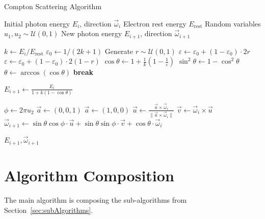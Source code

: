 \begin{algorithm}[H]
\caption{Compton Scattering Algorithm}
\label{alg:comptonScatteringBlank}
\begin{algorithmic}[1]
\Require Initial photon energy $E_i$, direction $\vec{\omega}_i$
\Require Electron rest energy $E_\text{rest}$
\Require Random variables $u_1, u_2 \sim \mathcal{U}(0, 1)$
\Ensure New photon energy $E_{i+1}$, direction $\vec{\omega}_{i+1}$

\State $k \gets E_i / E_\text{rest}$
\State $\varepsilon_0 \gets 1 / (2k + 1)$
\Repeat
    \State Generate $r \sim \mathcal{U}(0, 1)$
        \State $\varepsilon \gets \varepsilon_0 + (1 - \varepsilon_0) \cdot 2r$
    \Else
        \State $\varepsilon \gets \varepsilon_0 + (1 - \varepsilon_0) \cdot 2(1 - r)$
    \EndIf
    \State $\cos\theta \gets 1 + \frac{1}{k} \left(1 - \frac{1}{\varepsilon}\right)$
        \State $\sin^2\theta \gets 1 - \cos^2\theta$
            \State $\theta \gets \arccos(\cos\theta)$
            \State \textbf{break}
        \EndIf
    \EndIf
{}

\State $E_{i+1} \gets \frac{E_i}{1 + k (1 - \cos\theta)}$

\State $\phi \gets 2\pi u_2$
    \State $\vec{a} \gets (0, 0, 1)$
\Else
    \State $\vec{a} \gets (1, 0, 0)$
\EndIf
\State $\vec{u} \gets \frac{\vec{a} \times \vec{\omega}_i}{\|\vec{a} \times \vec{\omega}_i\|}$
\State $\vec{v} \gets \vec{\omega}_i \times \vec{u}$
\State $\vec{\omega}_{i+1} \gets \sin\theta \cos\phi \cdot \vec{u} + \sin\theta \sin\phi \cdot \vec{v} + \cos\theta \cdot \vec{\omega}_i$

\State \Return $E_{i+1}, \vec{\omega}_{i+1}$
\end{algorithmic}
\end{algorithm}


\section{Algorithm Composition}
\label{sec:algorithmComposition}
The main algorithm is composing the sub-algorithms from Section~\ref{sec:subAlgorithms}.

